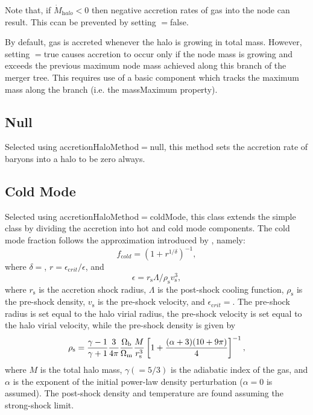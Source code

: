 Note that, if $\dot{M}_{\mathrm halo} < 0$ then negative accretion rates of gas into the node can result. This ccan be prevented by setting {\normalfont \ttfamily [accretionHalosSimpleNegativeAccretionAllowed]}$=${\normalfont \ttfamily false}.

By default, gas is accreted whenever the halo is growing in total mass. However, setting {\normalfont \ttfamily [accretionHalosSimpleAccreteNewGrowthOnly]}$=${\normalfont \ttfamily true} causes accretion to occur only if the node mass is growing and exceeds the previous maximum node mass achieved along this branch of the merger tree. This requires use of a basic component which tracks the maximum mass along the branch (i.e. the {\normalfont \ttfamily massMaximum} property).

\subsection{Null}\label{phys:accretionHalo:accretionHaloNull}

Selected using {\normalfont \ttfamily accretionHaloMethod}$=${\normalfont \ttfamily null}, this method sets the accretion rate of baryons into a halo to be zero always.

\subsection{Cold Mode}\label{phys:accretionHalo:accretionHaloColdMode}

Selected using {\normalfont \ttfamily accretionHaloMethod}$=${\normalfont \ttfamily coldMode}, this class extends the {\normalfont \ttfamily simple} class by dividing the accretion into hot and cold mode components. The cold mode fraction follows the approximation introduced by \cite{benson_cold_2010}, namely:
\begin{equation}
f_{\mathrm cold}=(1+r^{1/\delta})^{-1},
\end{equation}
where $\delta=${\normalfont \ttfamily [accretionColdModeShockStabilityTransitionWidth]}, $r = \epsilon_{\mathrm crit}/\epsilon$, and
\begin{equation}
\epsilon = r_{\mathrm s} \Lambda / \rho_{\mathrm s} v_{\mathrm s}^3,
\end{equation}
where $r_{\mathrm s}$ is the accretion shock radius, $\Lambda$ is the post-shock cooling function, $\rho_{\mathrm s}$ is the pre-shock density, $v_{\mathrm s}$ is the pre-shock velocity, and $\epsilon_{\mathrm crit}=${\normalfont \ttfamily [accretionColdModeShockStabilityThreshold]}. The pre-shock radius is set equal to the halo virial radius, the pre-shock velocity is set equal to the halo virial velocity, while the pre-shock density is given by
\begin{equation}
\rho_{\mathrm s} = {\gamma - 1 \over \gamma + 1} { 3 \over 4 \pi } { \Omega_{\mathrm b} \over \Omega_{\mathrm m} } {M \over r_{\mathrm s}^3} \left[ 1 + {(\alpha + 3) (10 + 9 \pi) \over 4} \right]^{-1},
\end{equation}
where $M$ is the total halo mass, $\gamma(=5/3)$ is the adiabatic index of the gas, and $\alpha$ is the exponent of the initial power-law density perturbation ($\alpha=0$ is assumed). The post-shock density and temperature are found assuming the strong-shock limit.

